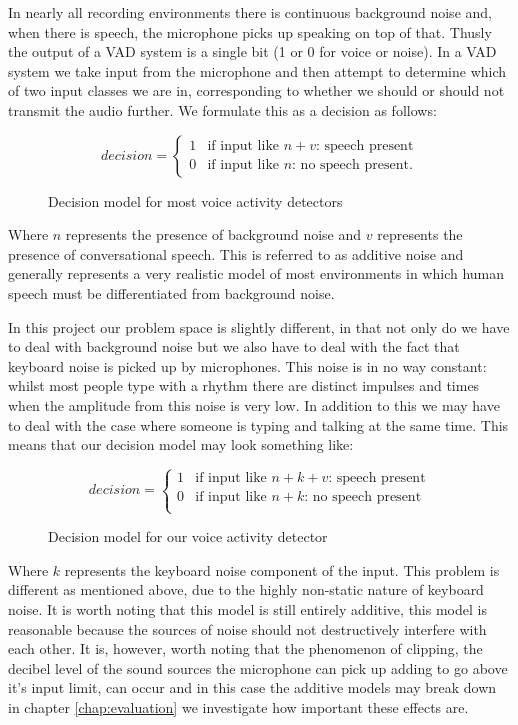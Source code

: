 \documentclass[ %
                    author={Sam Phippen},
                supervisor={Dr. Rafal Bogacz},
                     title={Real time voice activity detectors in noisy personal computing environments},
                  subtitle={},
                    degree={MEng},
                      year={2012} ]{thesis}
\begin{document}
In nearly all recording environments there is continuous background
noise and, when there is speech, the microphone picks up speaking on top of
that. Thusly the output of a VAD system is a single bit (1 or 0 for voice or
noise). In a VAD system we take input from the microphone and then attempt to
determine which of two input classes we are in, corresponding to whether we
should or should not transmit the audio further. We formulate this as a
decision as follows:

\begin{figure}
\[ decision = \left\{ \begin{array}{ll}
            1 & \mbox{if input like $n + v$: speech present}\\
    0 & \mbox{if input like $n$: no speech present}.\end{array} \right. \]
            \label{eqn:decision 1}
            \caption{Decision model for most voice activity detectors}
        \end{figure}

Where $n$ represents the presence of background noise and $v$ represents the
presence of conversational speech. This is referred to as additive
noise\cite{sohn} and generally represents a very realistic model of most
environments in which human speech must be differentiated from background noise.

In this project our problem space is slightly different, in that not only do we
have to deal with background noise but we also have to deal with the fact that
keyboard noise is picked up by microphones. This noise is in no way constant:
whilst most people type with a rhythm there are distinct impulses and times
when the amplitude from this noise is very low. In addition to this we may have
to deal with the case where someone is typing and talking at the same time. This
means that our decision model may look something like:

\begin{figure}
\[ decision = \left\{ \begin{array}{ll}
            1 & \mbox{if input like $n + k + v$: speech present}\\
            0 & \mbox{if input like $n + k$: no speech present}\\
    \end{array} \right. \]
            \label{eqn:decision 1}
            \caption{Decision model for our voice activity detector}
\end{figure}

Where $k$ represents the keyboard noise component of the input. This problem is
different as mentioned above, due to the highly non-static nature of keyboard
noise. It is worth noting that this model is still entirely additive, this
model is reasonable because the sources of noise should not destructively
interfere with each other. It is, however, worth noting that the phenomenon of
clipping, the decibel level of the sound sources the microphone can pick up
adding to go above it's input limit, can occur and in this case the additive
models may break down in chapter \ref{chap:evaluation} we investigate
how important these effects are.
\end{document}
